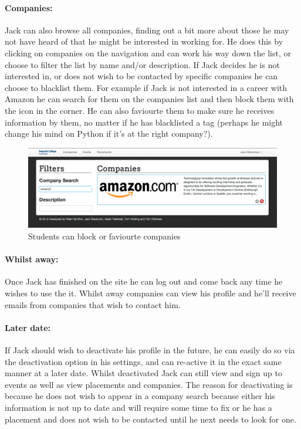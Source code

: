   \paragraph{Companies:}
    Jack can also browse all companies, finding out a bit more about those he may not have heard of that he might be interested in working for. He does this by clicking on companies on the navigation and can work his way down the list, or choose to filter the list by name and/or description.
    If Jack decides he is not interested in, or does not wish to be contacted by specific companies he can choose to blacklist them. For example if Jack is not interested in a career with Amazon he can search for them on the companies list and then block them with the icon in the corner. He can also faviourte them to make sure he receives information by them, no matter if he has blacklisted a tag (perhaps he might change his mind on Python if it's at the right company?).

    \begin{figure}[H]\centering
    \includegraphics[scale=0.3]{images/user_experiences/student/block_amazon}
    \caption{Students can block or faviourte companies}
    \end{figure}

  \paragraph{Whilst away:}
    Once Jack has finished on the site he can log out and come back any time he wishes to use the it. Whilst away companies can view his profile and he'll receive emails from companies that wish to contact him.

  \paragraph{Later date:}
    If Jack should wish to deactivate his profile in the future, he can easily do so via the deactivation option in his settings, and can re-active it in the exact same manner at a later date. Whilst deactivated Jack can still view and sign up to events as well as view placements and companies. The reason for deactivating is because he does not wish to appear in a company search because either his information is not up to date and will require some time to fix or he has a placement and does not wish to be contacted until he next needs to look for one.

